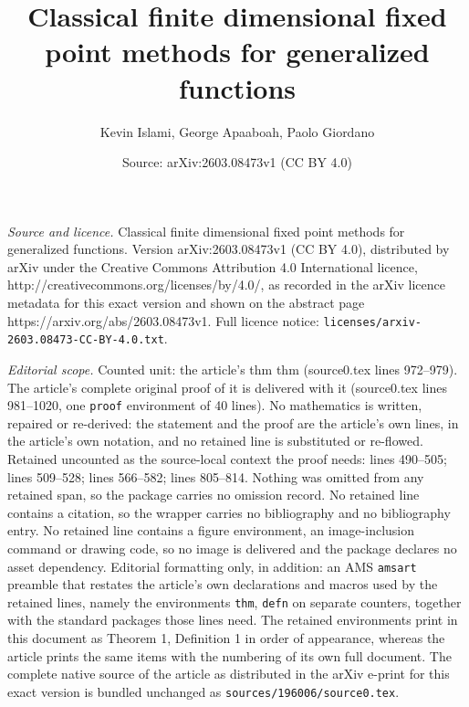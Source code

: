 \documentclass[10pt,a4paper]{amsart}
\title{Classical finite dimensional fixed point methods for generalized functions}
\author{Kevin Islami, George Apaaboah, Paolo Giordano}
\date{Source: arXiv:2603.08473v1 (CC BY 4.0)}
\begin{document}
\maketitle

\noindent\emph{Source and licence.} Classical finite dimensional fixed point methods for generalized functions. Version arXiv:2603.08473v1 (CC BY 4.0), distributed by arXiv under the Creative Commons Attribution 4.0 International licence, http://creativecommons.org/licenses/by/4.0/, as recorded in the arXiv licence metadata for this exact version and shown on the abstract page https://arxiv.org/abs/2603.08473v1. Full licence notice: \texttt{licenses/arxiv-2603.08473-CC-BY-4.0.txt}.\par\smallskip

\noindent\textit{Editorial scope.} Counted unit: the article's thm thm (source0.tex lines 972--979). The article's complete original proof of it is delivered with it (source0.tex lines 981--1020, one \texttt{proof} environment of 40 lines). No mathematics is written, repaired or re-derived: the statement and the proof are the article's own lines, in the article's own notation, and no retained line is substituted or re-flowed.  Retained uncounted as the source-local context the proof needs: lines 490--505; lines 509--528; lines 566--582; lines 805--814.  Nothing was omitted from any retained span, so the package carries no omission record.  No retained line contains a citation, so the wrapper carries no bibliography and no bibliography entry.  No retained line contains a figure environment, an image-inclusion command or drawing code, so no image is delivered and the package declares no asset dependency.  Editorial formatting only, in addition: an AMS \texttt{amsart} preamble that restates the article's own declarations and macros used by the retained lines, namely the environments \texttt{thm}, \texttt{defn} on separate counters, together with the standard packages those lines need.  The retained environments print in this document as Theorem 1, Definition 1 in order of appearance, whereas the article prints the same items with the numbering of its own full document.  The complete native source of the article as distributed in the arXiv e-print for this exact version is bundled unchanged as \texttt{sources/196006/source0.tex}.
\end{document}
